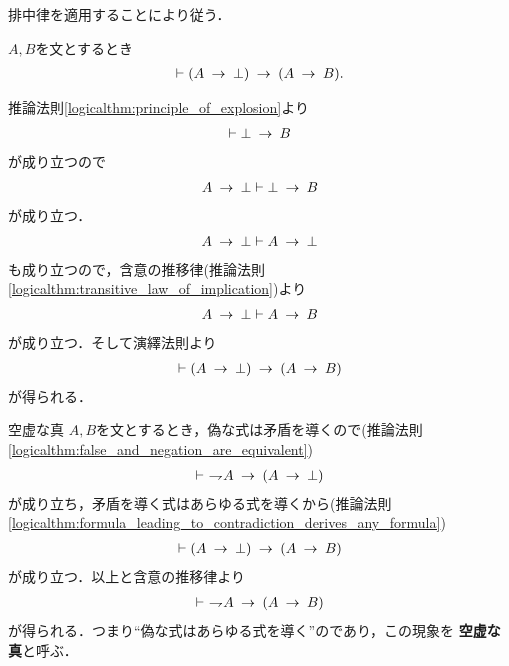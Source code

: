 	\begin{prf}
		排中律を適用することにより従う．
		\QED
	\end{prf}
	
	\begin{screen}
		\begin{logicalthm}[矛盾を導く式はあらゆる式を導く]\label{logicalthm:formula_leading_to_contradiction_derives_any_formula}
			$A,B$を文とするとき
			\begin{align}
				\vdash (A \rarrow \bot) \rarrow (A \rarrow B).
			\end{align}
		\end{logicalthm}
	\end{screen}
	
	\begin{prf}
		推論法則\ref{logicalthm:principle_of_explosion}より
		\begin{align}
			\vdash \bot \rarrow B
		\end{align}
		が成り立つので
		\begin{align}
			A \rarrow \bot \vdash \bot \rarrow B
		\end{align}
		が成り立つ．
		\begin{align}
			A \rarrow \bot \vdash A \rarrow \bot
		\end{align}
		も成り立つので，含意の推移律(推論法則\ref{logicalthm:transitive_law_of_implication})より
		\begin{align}
			A \rarrow \bot \vdash A \rarrow B
		\end{align}
		が成り立つ．そして演繹法則より
		\begin{align}
			\vdash (A \rarrow \bot) \rarrow (A \rarrow B)
		\end{align}
		が得られる．
		\QED
	\end{prf}
	
	\begin{itembox}[l]{空虚な真}
		$A,B$を文とするとき，偽な式は矛盾を導くので(推論法則\ref{logicalthm:false_and_negation_are_equivalent})
		\begin{align}
			\vdash\ \negation A \rarrow (A \rarrow \bot)
		\end{align}
		が成り立ち，矛盾を導く式はあらゆる式を導くから(推論法則\ref{logicalthm:formula_leading_to_contradiction_derives_any_formula})
		\begin{align}
			\vdash (A \rarrow \bot) \rarrow (A \rarrow B)
		\end{align}
		が成り立つ．以上と含意の推移律より
		\begin{align}
			\vdash\ \negation A \rarrow (A \rarrow B)
		\end{align}
		が得られる．つまり``偽な式はあらゆる式を導く''のであり，この現象を
		{\bf 空虚な真}と呼ぶ．
	\end{itembox}
	
